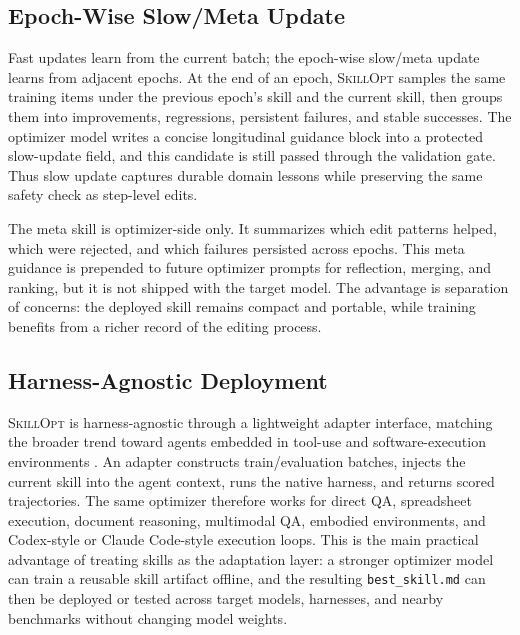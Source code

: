 \documentclass{llmxive}
\providecommand{\ourmethod}{\textsc{SkillOpt}\xspace}
\begin{document}
\subsection{Epoch-Wise Slow/Meta Update}
\label{sec:method_slow_meta}

Fast updates learn from the current batch; the epoch-wise slow/meta update learns from adjacent epochs. At the end of an epoch, \ourmethod{} samples the same training items under the previous epoch's skill and the current skill, then groups them into improvements, regressions, persistent failures, and stable successes. The optimizer model writes a concise longitudinal guidance block into a protected slow-update field, and this candidate is still passed through the validation gate. Thus slow update captures durable domain lessons while preserving the same safety check as step-level edits.

The meta skill is optimizer-side only. It summarizes which edit patterns helped, which were rejected, and which failures persisted across epochs. This meta guidance is prepended to future optimizer prompts for reflection, merging, and ranking, but it is not shipped with the target model. The advantage is separation of concerns: the deployed skill remains compact and portable, while training benefits from a richer record of the editing process.

\subsection{Harness-Agnostic Deployment}
\label{sec:method_harness}

\ourmethod{} is harness-agnostic through a lightweight adapter interface, matching the broader trend toward agents embedded in tool-use and software-execution environments \citep{yao2022react,schick2023toolformer,yang2024sweagent}. An adapter constructs train/evaluation batches, injects the current skill into the agent context, runs the native harness, and returns scored trajectories. The same optimizer therefore works for direct QA, spreadsheet execution, document reasoning, multimodal QA, embodied environments, and Codex-style or Claude Code-style execution loops. This is the main practical advantage of treating skills as the adaptation layer: a stronger optimizer model can train a reusable skill artifact offline, and the resulting \texttt{best\_skill.md} can then be deployed or tested across target models, harnesses, and nearby benchmarks without changing model weights.
\end{document}
